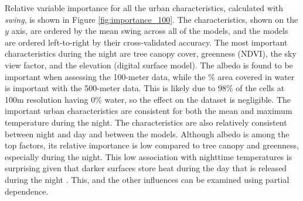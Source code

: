 \documentclass[final,3p,times,twocolumn,sort&compress]{elsarticle}
\begin{document}
Relative variable importance for all the urban characteristics, calculated with \textit{swing}, is shown in Figure \ref{fig:importance_100}. 
The characteristics, shown on the $y$ axis, are ordered by the mean swing across all of the models, and the models are ordered left-to-right by their cross-validated accuracy.
The most important characteristics during the night are tree canopy cover, greenness (NDVI), the sky view factor, and the elevation (digital surface model).
The albedo is found to be important when assessing the 100-meter data, while the \% area covered in water is important with the 500-meter data.
This is likely due to 98\% of the cells at 100m resolution having 0\% water, so the effect on the dataset is negligible.
The important urban characteristics are consistent for both the mean and maximum temperature during the night.
The characteristics are also relatively consistent between night and day and between the models. 
Although albedo is among the top factors, its relative importance is low compared to tree canopy and greenness, especially during the night. 
This low association with nighttime temperatures is surprising given that darker surfaces store heat during the day that is released during the night \cite{Voogt2003-mm, Zhou2014-wc}.
This, and the other influences can be examined using partial dependence.
\end{document}
